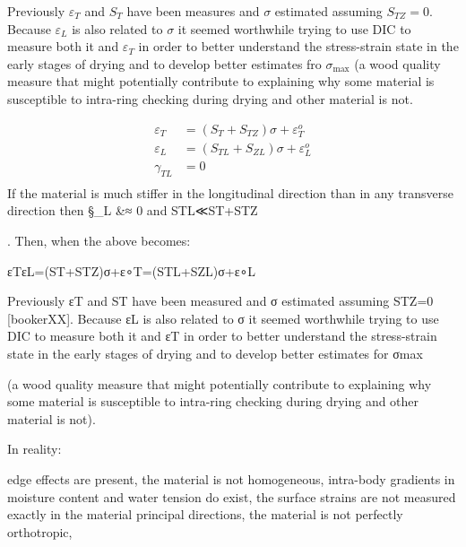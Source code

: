 Previously $\varepsilon_T$ and $S_T$ have been measures and $\sigma$ estimated assuming $S_{TZ}=0$\citep{bookerXX}. Because $\varepsilon_L$ is also related to $\sigma$ it seemed worthwhile trying to use DIC to measure both it and $\varepsilon_T$ in order to better understand the stress-strain state in the early stages of drying and to develop better estimates fro $\sigma_\max$ (a wood quality measure that might potentially contribute to explaining why some material is susceptible to intra-ring checking during drying and other material is not.

\begin{eqnarray}
\varepsilon_T &= \left(S_T + S_{TZ}\right)\sigma + \varepsilon^o_T \\
\varepsilon_L &= \left(S_{TL} + S_{ZL}\right)\sigma + \varepsilon^o_L \\
\gamma_{TL} &= 0 \\
\end{eqnarray}
If the material is much stiffer in the longitudinal direction than in any transverse direction then \S_L &≈ 0 and STL≪ST+STZ

. Then, when the above becomes:

εTεL=(ST+STZ)σ+ε∘T=(STL+SZL)σ+ε∘L

Previously εT
and ST have been measured and σ estimated assuming STZ=0 [bookerXX]. Because εL is also related to σ it seemed worthwhile trying to use DIC to measure both it and εT in order to better understand the stress-strain state in the early stages of drying and to develop better estimates for σmax

(a wood quality measure that might potentially contribute to explaining why some material is susceptible to intra-ring checking during drying and other material is not).

In reality:

    edge effects are present,
    the material is not homogeneous,
    intra-body gradients in moisture content and water tension do exist,
    the surface strains are not measured exactly in the material principal directions,
    the material is not perfectly orthotropic,